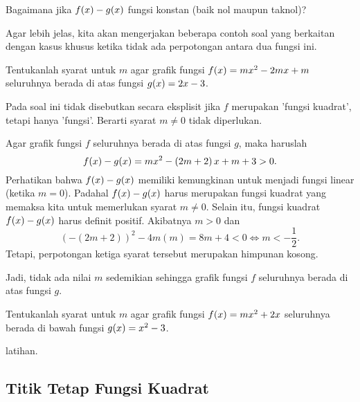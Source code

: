 		\begin{explbox}
			Bagaimana jika $ \mathop{}\!{f}{\left({x}\right)} - \mathop{}\!{g}{\left({x}\right)} $ fungsi konstan (baik nol maupun taknol)?
		\end{explbox}
		
		\par Agar lebih jelas, kita akan mengerjakan beberapa contoh soal yang berkaitan dengan kasus khusus ketika tidak ada perpotongan antara dua fungsi ini.
		
		\begin{contoh}
			Tentukanlah syarat untuk $ m $ agar grafik fungsi $ \mathop{}\!{f}{\left({x}\right)} = mx^{2} - 2mx + m $ seluruhnya berada di atas fungsi $ \mathop{}\!{g}{\left({x}\right)} = 2x - 3 $.
		\end{contoh}
		\begin{jawab}
			Pada soal ini tidak disebutkan secara eksplisit jika $ f $ merupakan 'fungsi kuadrat', tetapi hanya 'fungsi'. Berarti syarat $ m \ne 0 $ tidak diperlukan.
			\par Agar grafik fungsi $ f $ seluruhnya berada di atas fungsi $ g $, maka haruslah
			\[ \mathop{}\!{f}{\left({x}\right)} - \mathop{}\!{g}{\left({x}\right)} = mx^{2} - \left(2m + 2\right)x + m + 3 > 0. \]
			Perhatikan bahwa $ \mathop{}\!{f}{\left({x}\right)} - \mathop{}\!{g}{\left({x}\right)} $ memiliki kemungkinan untuk menjadi fungsi linear (ketika $ m = 0 $). Padahal $ \mathop{}\!{f}{\left({x}\right)} - \mathop{}\!{g}{\left({x}\right)} $ harus merupakan fungsi kuadrat yang memaksa kita untuk memerlukan syarat $ m \ne 0 $. Selain itu, fungsi kuadrat $ \mathop{}\!{f}{\left({x}\right)} - \mathop{}\!{g}{\left({x}\right)} $ harus definit positif. Akibatnya $ m > 0 $ dan
			\[ \left(-\left(2m + 2\right)\right)^{2} - 4m\left(m\right) = 8m + 4 < 0 \iff m < -\frac{1}{2}. \]
			Tetapi, perpotongan ketiga syarat tersebut merupakan himpunan kosong.
			\par Jadi, tidak ada nilai $ m $ sedemikian sehingga grafik fungsi $ f $ seluruhnya berada di atas fungsi $ g $.
		\end{jawab}
		
		\begin{contoh}
			Tentukanlah syarat untuk $ m $ agar grafik fungsi $ \mathop{}\!{f}{\left({x}\right)} = mx^{2} + 2x $ seluruhnya berada di bawah fungsi $ \mathop{}\!{g}{\left({x}\right)} = x^{2} - 3 $.
		\end{contoh}
		\begin{jawab}
			latihan.
		\end{jawab}
	
\subsection{Titik Tetap Fungsi Kuadrat}
	
